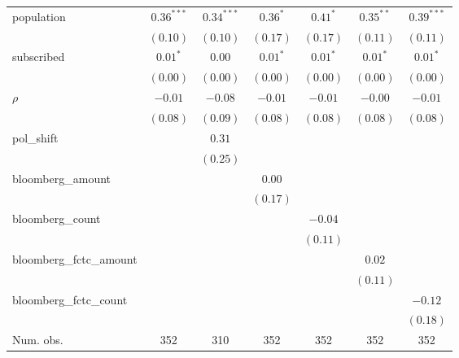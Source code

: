 \begin{table}[!h]
\begin{center}
\begin{tabular}{l c c c c c c }
population              & $0.36^{***}$ & $0.34^{***}$ & $0.36^{*}$   & $0.41^{*}$   & $0.35^{**}$  & $0.39^{***}$ \\
                        & $(0.10)$     & $(0.10)$     & $(0.17)$     & $(0.17)$     & $(0.11)$     & $(0.11)$     \\
subscribed              & $0.01^{*}$   & $0.00$       & $0.01^{*}$   & $0.01^{*}$   & $0.01^{*}$   & $0.01^{*}$   \\
                        & $(0.00)$     & $(0.00)$     & $(0.00)$     & $(0.00)$     & $(0.00)$     & $(0.00)$     \\
$\rho$                  & $-0.01$      & $-0.08$      & $-0.01$      & $-0.01$      & $-0.00$      & $-0.01$      \\
                        & $(0.08)$     & $(0.09)$     & $(0.08)$     & $(0.08)$     & $(0.08)$     & $(0.08)$     \\
pol\_shift              &              & $0.31$       &              &              &              &              \\
                        &              & $(0.25)$     &              &              &              &              \\
bloomberg\_amount       &              &              & $0.00$       &              &              &              \\
                        &              &              & $(0.17)$     &              &              &              \\
bloomberg\_count        &              &              &              & $-0.04$      &              &              \\
                        &              &              &              & $(0.11)$     &              &              \\
bloomberg\_fctc\_amount &              &              &              &              & $0.02$       &              \\
                        &              &              &              &              & $(0.11)$     &              \\
bloomberg\_fctc\_count  &              &              &              &              &              & $-0.12$      \\
                        &              &              &              &              &              & $(0.18)$     \\
\midrule
Num. obs.               & 352          & 310          & 352          & 352          & 352          & 352          \\

\end{tabular}
\end{center}
\end{table}
